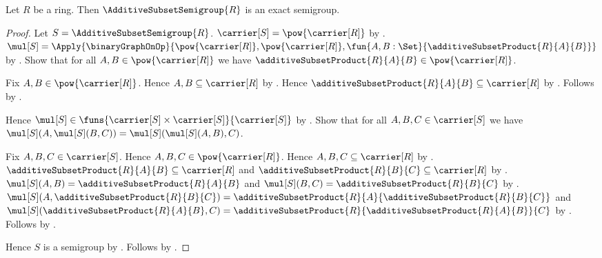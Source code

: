 \begin{theorem}\label{additive_subset_semigroup_is_exact}
    Let $R$ be a ring.
    Then $\AdditiveSubsetSemigroup{R}$ is an exact semigroup.
\end{theorem}
\begin{proof}
    Let $S=\AdditiveSubsetSemigroup{R}$.
    $\carrier[S]=\pow{\carrier[R]}$ by
        .
    $\mul[S]=\Apply{\binaryGraphOnOp}{
        \pow{\carrier[R]},\pow{\carrier[R]},
        \fun{A,B:\Set}{\additiveSubsetProduct{R}{A}{B}}}$ by
        .
    Show that for all $A,B\in\pow{\carrier[R]}$ we have
        $\additiveSubsetProduct{R}{A}{B}\in\pow{\carrier[R]}$.
    \begin{subproof}
        Fix $A,B\in\pow{\carrier[R]}$.
        Hence $A,B\subseteq\carrier[R]$ by .
        Hence $\additiveSubsetProduct{R}{A}{B}\subseteq\carrier[R]$ by
            .
        Follows by .
    \end{subproof}
    Hence $\mul[S]\in
        \funs{\carrier[S]\times\carrier[S]}{\carrier[S]}$ by
        .
    Show that for all $A,B,C\in\carrier[S]$ we have
        $\mul[S](A,\mul[S](B,C))
            =\mul[S](\mul[S](A,B),C)$.
    \begin{subproof}
        Fix $A,B,C\in\carrier[S]$.
        Hence $A,B,C\in\pow{\carrier[R]}$.
        Hence $A,B,C\subseteq\carrier[R]$ by .
        $\additiveSubsetProduct{R}{A}{B}\subseteq\carrier[R]$ and
            $\additiveSubsetProduct{R}{B}{C}\subseteq\carrier[R]$ by
            .
        $\mul[S](A,B)=\additiveSubsetProduct{R}{A}{B}$ and
            $\mul[S](B,C)=\additiveSubsetProduct{R}{B}{C}$ by
            .
        $\mul[S](A,\additiveSubsetProduct{R}{B}{C})
            =\additiveSubsetProduct{R}{A}{
                \additiveSubsetProduct{R}{B}{C}}$ and
        $\mul[S](\additiveSubsetProduct{R}{A}{B},C)
            =\additiveSubsetProduct{R}{
                \additiveSubsetProduct{R}{A}{B}}{C}$ by
            .
        Follows by .
    \end{subproof}
    Hence $S$ is a semigroup by
        .
    Follows by
        .
\end{proof}

